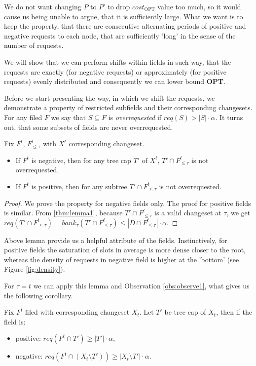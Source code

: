 We do not want changing $P$ to $P'$ to drop $cost_{\mathrm{OPT}}$ value too 
much, so it would cause us being unable to argue, that it is sufficiently large.
What we want is to keep the property, that there are consecutive alternating
periods of positive and negative requests to each node, that are sufficiently
'long' in the sense of the number of requests. 

We will show that we can perform shifts within fields in such way, 
that the requests are exactly (for negative requests) or approximately (for 
positive 
requests) evenly distributed and consequently we can lower bound \textbf{OPT}.

Before we start presenting the way, in which we shift the requests, we
demonstrate a property of restricted subfields and their corresponding changesets.
For any filed $F$ we say that $S \subseteq F$ is \textit{overrequested}
if $req(S) > |S| \cdot \alpha$. It turns out, that some subsets of fields
are never overrequested.
\begin{lemma}
Fix $F^t$, $F^t_{\leq \tau}$ with $X^t$ corresponding changeset.
\begin{itemize}
 \item If $F^t$ is negative, then for any tree cap $T'$ of $X^t$, $T' \cap 
F^t_{\leq \tau}$ is not overrequested.
\item If $F^t$ is positive, then for any subtree $T'\cap F^t_{\leq \tau}$ is not 
overrequested.
\end{itemize}
\label{thm:not_over_requested}
\end{lemma}
\begin{proof}
We prove the property for negative fields only. The proof for positive fields
is similar. From \ref{thm:lemma1}, because $T' \cap  F^t_{\leq \tau}$ is a valid 
changeset at $\tau$, we get $req(T' \cap  F^t_{\leq \tau}) = bank_{\tau}(T' 
\cap F^t_{\leq \tau}) \leq |D \cap F^t_{\leq \tau}| \cdot \alpha$.
\end{proof}

Above lemma provide us a helpful attribute of the fields. Instinctively, for positive 
fields the saturation of slots in average is more dense closer to 
the root, whereas the density of requests in negative field is higher at the 
'bottom' (see Figure \ref{fig:density}).

For $\tau = t$ we can apply this lemma and Observation \ref{obs:observe1}, 
what gives us the following corollary.
\begin{corollary}
Fix $F^t$ filed with corresponding changeset $X_t$. Let $T'$ be tree cap of 
$X_t$, then if the field is:
 \begin{itemize}
  \item positive: $req(F^t \cap T') \geq |T'| \cdot \alpha$,
  \item negative: $req(F^t \cap (X_t \setminus T')) \geq |X_t \setminus 
T'| \cdot \alpha$.
 \end{itemize}
 \label{thm:proper_at_t}
\end{corollary}

